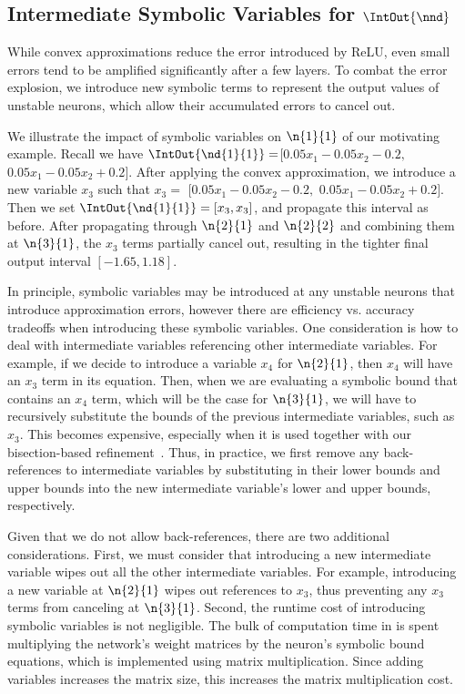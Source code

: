 \subsection{Intermediate Symbolic Variables for $\IntOut{\nnd}$}
\label{neurodiff:sec:symbolic}


While convex approximations reduce the error introduced by ReLU, even
small errors tend to be amplified significantly after a few layers.
To combat the error explosion, we introduce new symbolic terms to represent the
output values of unstable neurons, which allow their accumulated
errors to cancel out.


We illustrate the impact of symbolic variables on $ \n{1}{1} $ of our
motivating example. Recall we have $ \IntOut{\nd{1}{1}} =$$ [0.05x_1 -
0.05x_2 - 0.2,$ $ 0.05x_1 - 0.05x_2 + 0.2] $. After applying the
convex approximation, we introduce a new variable $ x_3$
such that $ x_3 = $ $ [0.05x_1 - 0.05x_2 - 0.2, $ $
0.05x_1 - 0.05x_2 + 0.2 ]$.
Then we set $ \IntOut{\nd{1}{1}} = [x_3, x_3] $, and
propagate this interval as before. After propagating through
$ \n{2}{1} $ and $ \n{2}{2} $ and combining them at $ \n{3}{1} $, the
$ x_3 $ terms partially cancel out, resulting in the tighter final
output interval $ [-1.65, 1.18] $.

In principle, symbolic variables may be introduced at any unstable
neurons that introduce approximation errors,
however there are efficiency vs. accuracy tradeoffs when
introducing these symbolic variables.  One consideration
is how to deal with intermediate variables referencing other
intermediate variables. For example, if we decide to introduce a
variable $ x_4 $ for $ \n{2}{1} $, then $ x_4 $ will have an $ x_3 $
term in its equation. Then, when we are evaluating a symbolic bound that
contains
an $ x_4 $ term, which will be the case for $ \n{3}{1} $, we will have to
recursively substitute the bounds of the
previous intermediate variables, such as $ x_3 $. This becomes expensive,
especially when it is used together with our bisection-based
refinement~\cite{WangPWYJ18,PaulsenWW20}.
%
Thus, in practice, we first remove any back-references to intermediate
variables by substituting in their lower bounds and upper bounds into the
new intermediate variable's lower and upper bounds, respectively.

Given that we do not allow back-references, there are two
additional considerations.
%
First, we must consider that introducing a new intermediate
variable wipes out all the other intermediate variables.  For
example, introducing a new variable at $ \n{2}{1} $ wipes out references
to $ x_3 $, thus preventing any $ x_3 $ terms from canceling at $ \n{3}{1} $.
%
Second, the runtime cost of introducing symbolic variables is not
negligible. The bulk of computation time in \Name{} is spent
multiplying the network's weight matrices by the neuron's symbolic
bound equations, which is implemented using matrix multiplication. Since adding
variables increases the matrix size, this increases the matrix
multiplication cost.


